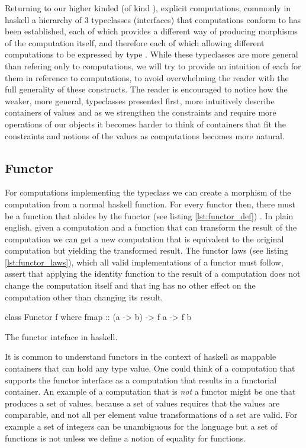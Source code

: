 Returning to our higher kinded (of kind \hask{* -> *}), explicit
computations, commonly in haskell a hierarchy of 3 typeclasses
(interfaces) that computations conform to has been established, each
of which provides a different way of producing morphisms of the
computation itself, and therefore each of which allowing different
computations to be expressed by type . While these typeclasses are
more general than refering only to computations, we will try to
provide an intuition of each for them in reference to computations, to
avoid overwhelming the reader with the full generality of these
constructs. The reader is encouraged to notice how the weaker, more
general, typeclasses presented first, more intuitively describe
containers of values and as we strengthen the constraints and require
more operations of our objects it becomes harder to think of
containers that fit the constraints and notions of the values as
computations becomes more natural.

\subsection{Functor}

For computations implementing the  typeclass we can
create a morphism of the computation from a normal haskell
function. For every functor  then, there must be a function
 that abides by the functor (see
listing \ref{lst:functor_def})
\cite{mcbrideApplicativeProgrammingEffects2008}. In plain english,
given a computation and a function that can transform the result of
the computation we can get a new computation that is equivalent to the
original computation but yielding the transformed result. The functor
laws (see listing \ref{lst:functor_laws}), which all valid
implementations of a functor must follow, assert that applying the
identity function to the result of a computation does not change the
computation itself and that  ing has no other effect on the
computation other than changing its result.
\begin{code}
\begin{haskellcode}
class Functor f where
  fmap :: (a -> b) -> f a -> f b
\end{haskellcode}
\caption{\label{lst:functor_def}The functor inteface in haskell.}
\end{code}

It is common to understand functors in the context of haskell as
mappable containers that can hold any type value. One could think of a
computation that supports the functor interface as a computation that
results in a functorial container. An example of a computation that is
\emph{not} a functor might be one that produces a set of values,
because a set of values requires that the values are comparable, and
not all per element value transformations of a set are valid. For
example a set of integers  can be unambiguous for the
language but a set of functions  is not
unless we define a notion of equality for functions.

